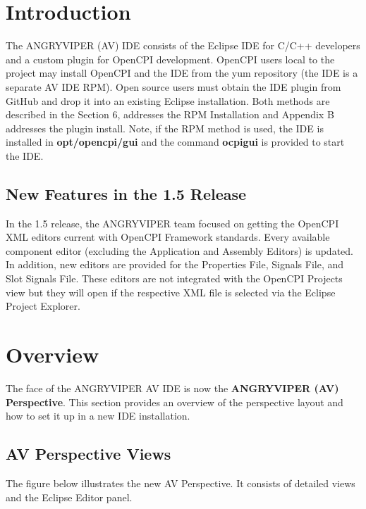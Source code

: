 \documentclass[10pt, a4paper, oneside]{article}
\begin{document}
\section{Introduction}
The ANGRYVIPER (AV) {IDE} consists of the Eclipse IDE for C/C++ developers and a custom plugin for OpenCPI development. OpenCPI users local to the project may install OpenCPI and the IDE from the yum repository (the IDE is a separate AV IDE RPM). Open source users must obtain the IDE plugin from GitHub and drop it into an existing Eclipse installation. Both methods are described in the  Section 6, addresses the RPM Installation and Appendix B addresses the plugin install. Note, if the RPM method is used, the IDE is installed in \textbf{opt/opencpi/gui} and the command \textbf{ocpigui} is provided to start the IDE.
\subsection{New Features in the 1.5 Release}
In the 1.5 release, the ANGRYVIPER team focused on getting the OpenCPI XML editors current with OpenCPI Framework standards. Every available component editor (excluding the Application and Assembly Editors) is updated. In addition, new editors are provided for the Properties File, Signals File, and Slot Signals File. These editors are not integrated with the OpenCPI Projects view but they will open if the respective XML file is selected via the Eclipse Project Explorer.

\newpage
\section{Overview}
The face of the ANGRYVIPER {AV} IDE is now the \textbf{ANGRYVIPER (AV) Perspective}. This section provides an overview of the perspective layout and how to set it up in a new IDE installation.
\subsection{AV Perspective Views}
The figure below illustrates the new AV Perspective. It consists of detailed views and the Eclipse Editor panel.
\end{document}
